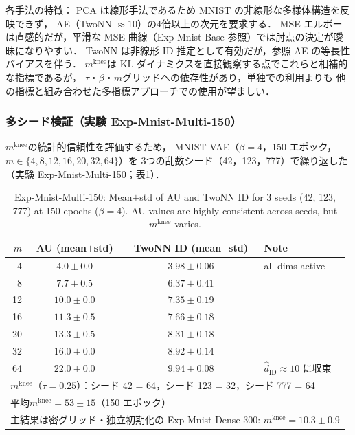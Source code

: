 \documentclass[11pt,a4paper]{jsarticle}
\newcommand{\mknee}{m^{\mathrm{knee}}}
\begin{document}
各手法の特徴：
PCA は線形手法であるため MNIST の非線形な多様体構造を反映できず，
AE（TwoNN $\approx 10$）の4倍以上の次元を要求する．
MSE エルボーは直感的だが，平滑な MSE 曲線（Exp-Mnist-Base 参照）では肘点の決定が曖昧になりやすい．
TwoNN は非線形 ID 推定として有効だが，参照 AE の等長性バイアスを伴う．
$\mknee$は KL ダイナミクスを直接観察する点でこれらと相補的な指標であるが，
$\tau$・$\beta$・$m$グリッドへの依存性があり，単独での利用よりも
他の指標と組み合わせた多指標アプローチでの使用が望ましい．

\subsubsection{多シード検証（実験 Exp-Mnist-Multi-150）}\label{sec:exp_multiseed}

$\mknee$の統計的信頼性を評価するため，
MNIST VAE（$\beta = 4$，150 エポック，$m \in \{4,8,12,16,20,32,64\}$）を
3つの乱数シード（42，123，777）で繰り返した（実験 Exp-Mnist-Multi-150；表\ref{tab:e4_multiseed}）．

\begin{table}[H]
\centering
\caption{Exp-Mnist-Multi-150: Mean$\pm$std of AU and TwoNN ID for 3 seeds (42, 123, 777) at 150 epochs ($\beta=4$). AU values are highly consistent across seeds, but $\mknee$ varies.}
\label{tab:e4_multiseed}
\small
\begin{tabular}{rccl}
\toprule
$m$ & AU (mean$\pm$std) & TwoNN ID (mean$\pm$std) & Note \\
\midrule
 4 & $4.0 \pm 0.0$ & $3.98 \pm 0.06$ & all dims active \\
 8 & $7.7 \pm 0.5$ & $6.37 \pm 0.41$ & \\
12 & $10.0 \pm 0.0$ & $7.35 \pm 0.19$ & \\
16 & $11.3 \pm 0.5$ & $7.66 \pm 0.18$ & \\
20 & $13.3 \pm 0.5$ & $8.31 \pm 0.18$ & \\
32 & $16.0 \pm 0.0$ & $8.92 \pm 0.14$ & \\
64 & $22.0 \pm 0.0$ & $9.94 \pm 0.08$ & $\hat{d}_\mathrm{ID} \approx 10$ に収束 \\
\midrule
\multicolumn{4}{l}{$\mknee$（$\tau=0.25$）：シード 42 = 64，シード 123 = 32，シード 777 = 64} \\
\multicolumn{4}{l}{平均$\mknee = 53 \pm 15$（150 エポック）} \\
\multicolumn{4}{l}{主結果は密グリッド・独立初期化の Exp-Mnist-Dense-300: $\mknee = 10.3 \pm 0.9$} \\
\bottomrule
\end{tabular}
\end{table}
\end{document}
